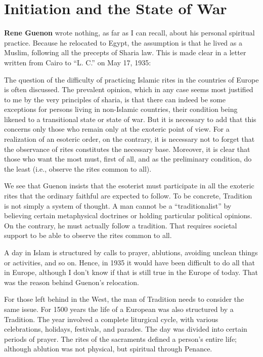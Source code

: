 \section{Initiation and the State of War}

\textbf{Rene Guenon} wrote nothing, as far as I can recall, about his personal spiritual practice. Because he relocated to Egypt, the assumption is that he lived as a Muslim, following all the precepts of Sharia law. This is made clear in a letter written from Cairo to ``L. C.'' on May 17, 1935:

\begin{quotex}
The question of the difficulty of practicing Islamic rites in the countries of Europe is often discussed. The prevalent opinion, which in any case seems most justified to me by the very principles of sharia, is that there can indeed be some exceptions for persons living in non-Islamic countries, their condition being likened to a transitional state or state of war. But it is necessary to add that this concerns only those who remain only at the exoteric point of view. For a realization of an esoteric order, on the contrary, it is necessary not to forget that the observance of rites constitutes the necessary base. Moreover, it is clear that those who want the most must, first of all, and as the preliminary condition, do the least (i.e., observe the rites common to all).
\end{quotex}


We see that Guenon insists that the esoterist must participate in all the exoteric rites that the ordinary faithful are expected to follow. To be concrete, Tradition is not simply a system of thought. A man cannot be a ``traditionalist'' by believing certain metaphysical doctrines or holding particular political opinions. On the contrary, he must actually follow a tradition. That requires societal support to be able to observe the rites common to all.

A day in Islam is structured by calls to prayer, ablutions, avoiding unclean things or activities, and so on. Hence, in 1935 it would have been difficult to do all that in Europe, although I don't know if that is still true in the Europe of today. That was the reason behind Guenon's relocation.

For those left behind in the West, the man of Tradition needs to consider the same issue. For 1500 years the life of a European was also structured by a Tradition. The year involved a complete liturgical cycle, with various celebrations, holidays, festivals, and parades. The day was divided into certain periods of prayer. The rites of the sacraments defined a person's entire life; although ablution was not physical, but spiritual through Penance.


